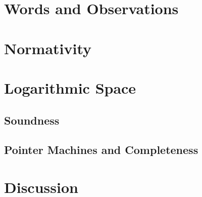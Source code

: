 \section{Words and Observations}\label{sec_words}
	
	
	
\section{Normativity}\label{sec_normativity}
	

\section{Logarithmic Space}\label{sec_logspace}
	\subsection{Soundness}
	
	\subsection{Pointer Machines and Completeness}
	

\section*{Discussion}



\newpage
{}

